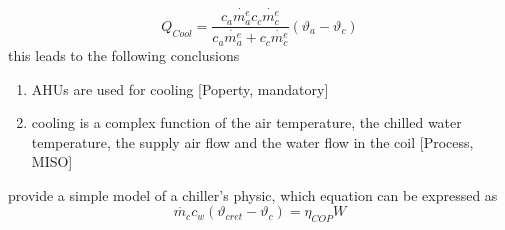 \begin{equation}
  Q_{Cool}=\frac{c_a\dot{m_{a}^{e}}c_c\dot{m_{c}^{e}}}{c_{a}\dot{m_{a}^{e}}+c_c\dot{m_{c}^{e}}}(\vartheta_{a}-\vartheta_{c}) \label{eq:cooling_load}
\end{equation}
this leads to the following conclusions
\begin{enumerate}
  \item AHUs are used for cooling [Poperty, mandatory]
  \item cooling is a complex function of the air temperature, the chilled water temperature, the supply air flow and the water flow in the coil [Process, MISO]
\end{enumerate}
\textcite{building_chiller_physics} provide a simple model of a chiller's physic, which equation can be expressed as
\begin{equation}
  \dot{m_c}c_w(\vartheta_{cret}-\vartheta_c)=\eta_{COP}W
\end{equation}
